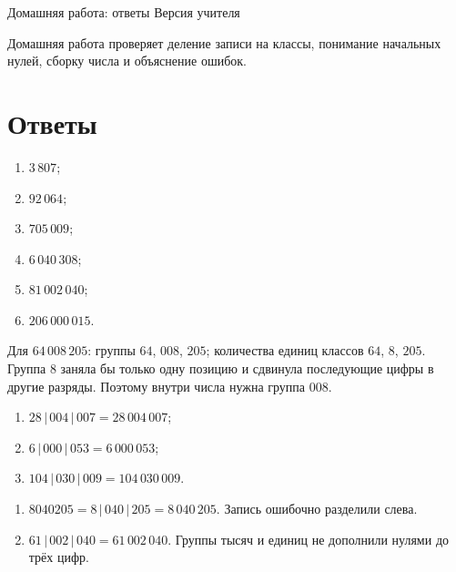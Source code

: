 \worksheettitle
  {Домашняя работа: ответы}
  { Версия учителя}

\begin{teacherbox}[Назначение]
  Домашняя работа проверяет деление записи на классы, понимание начальных
  нулей, сборку числа и объяснение ошибок.
\end{teacherbox}

\section{Ответы}

\begin{teacherbox}
  \begin{enumerate}
    \item \(3\,807\);
    \item \(92\,064\);
    \item \(705\,009\);
    \item \(6\,040\,308\);
    \item \(81\,002\,040\);
    \item \(206\,000\,015\).
  \end{enumerate}
\end{teacherbox}

\begin{teacherbox}
  Для \(64\,008\,205\): группы \(64\), \(008\), \(205\); количества единиц
  классов \(64\), \(8\), \(205\). Группа \(8\) заняла бы только одну позицию и
  сдвинула последующие цифры в другие разряды. Поэтому внутри числа нужна
  группа \(008\).
\end{teacherbox}

\begin{teacherbox}
  \begin{enumerate}
    \item \(28\,|\,004\,|\,007=28\,004\,007\);
    \item \(6\,|\,000\,|\,053=6\,000\,053\);
    \item \(104\,|\,030\,|\,009=104\,030\,009\).
  \end{enumerate}
\end{teacherbox}

\newpage
\begin{teacherbox}
  \begin{enumerate}
    \item \(8040205=8\,|\,040\,|\,205=8\,040\,205\). Запись ошибочно
      разделили слева.
    \item \(61\,|\,002\,|\,040=61\,002\,040\). Группы тысяч и единиц не
      дополнили нулями до трёх цифр.
  \end{enumerate}
\end{teacherbox}

